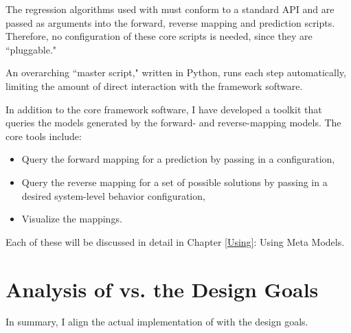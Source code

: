 The regression algorithms used with \fw must conform to a standard API and are passed as arguments into the forward, reverse mapping and prediction scripts.
Therefore, no configuration of these core scripts is needed, since they are ``pluggable."

An overarching ``master script," written in Python, runs each step automatically, limiting the amount of direct interaction with the framework software.

In addition to the core framework software, I have developed a toolkit that queries the models generated by the forward- and reverse-mapping models.
The core tools include:
\begin{itemize}
   \item Query the forward mapping for a prediction by passing in a configuration,
   \item Query the reverse mapping for a set of possible solutions by passing in a desired system-level behavior configuration,
   \item Visualize the mappings.
\end{itemize}
Each of these will be discussed in detail in Chapter \ref{Using}: Using Meta Models.






\section{Analysis of \fw  vs. the Design Goals}
In summary, I align the actual implementation of \fw with the design goals.



